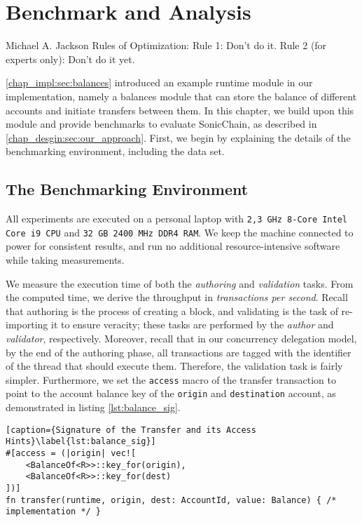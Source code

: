 \chapter{Benchmark and Analysis}  \label{chap:bench_analysis}

\begin{chapquote}{Michael A. Jackson}
    Rules of Optimization:
    Rule 1: Don't do it.
    Rule 2 (for experts only): Don't do it yet.
\end{chapquote}

\ref{chap_impl:sec:balances} introduced an example runtime module in our implementation, namely a
balances module that can store the balance of different accounts and initiate transfers between
them. In this chapter, we build upon this module and provide benchmarks to evaluate SonicChain, as
described in \ref{chap_desgin:sec:our_approach}. First, we begin by explaining the details of the
benchmarking environment, including the data set.

\section{The Benchmarking Environment}

All experiments are executed on a personal laptop with \texttt{2,3 GHz 8-Core Intel Core i9 CPU} and
\texttt{32 GB 2400 MHz DDR4 RAM}. We keep the machine connected to power for consistent results, and
run no additional resource-intensive software while taking measurements.

We measure the execution time of both the \textit{authoring} and \textit{validation} tasks. From the
computed time, we derive the throughput in \textit{transactions per second}. Recall that authoring
is the process of creating a block, and validating is the task of re-importing it to ensure
veracity; these tasks are performed by the \textit{author} and \textit{validator}, respectively.
Moreover, recall that in our concurrency delegation model, by the end of the authoring phase, all
transactions are tagged with the identifier of the thread that should execute them. Therefore, the
validation task is fairly simpler. Furthermore, we set the \texttt{access} macro of the transfer
transaction to point to the account balance key of the \texttt{origin} and \texttt{destination}
account, as demonstrated in listing \ref{lst:balance_sig}.

\begin{minipage}{\linewidth}
\begin{lstlisting}[caption={Signature of the Transfer and its Access Hints}\label{lst:balance_sig}]
#[access = (|origin| vec![
    <BalanceOf<R>>::key_for(origin),
    <BalanceOf<R>>::key_for(dest)
])]
fn transfer(runtime, origin, dest: AccountId, value: Balance) { /* implementation */ }
\end{lstlisting}
\end{minipage}


